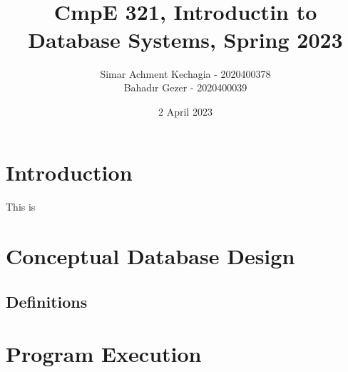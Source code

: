 \documentclass[12pt, A4, titlepage]{article}
\title{\vspace{-2cm} \HHUGE{Project 1} \\ \vspace{1cm} \TitleFont{Movie Database} \\ \vspace{0.7cm} \LARGE CmpE 321, Introductin to Database Systems, Spring 2023 \vspace{6cm}}
\author{
    Simar Achment Kechagia - 2020400378 \\
    Bahadır Gezer - 2020400039 \\
}
\date{2 April 2023}
\begin{document}
\maketitle

\newpage
\tableofcontents

\section{Introduction}
This is 

\section{Conceptual Database Design}






\subsection{Definitions}


\section{Program Execution}
\end{document}
